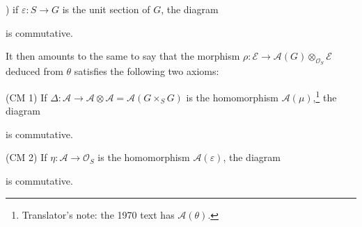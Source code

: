 \smallskip
{}\label{diag:sga3-VIB-11.6-2}%
) if \(\varepsilon:S\to G\) is the unit section of
\(G\), the diagram
\begin{center}
\end{center}
is commutative.

It then amounts to the same to say that the morphism
\(\rho:\mathcal E\to\mathcal A(G)\otimes_{\mathcal O_S}\mathcal E\)
deduced from \(\theta\) satisfies the following two axioms:

\smallskip
{}\label{cond:sga3-VIB-11.6-CM1}%
\noindent\textup{(CM 1)} If
\(\Delta:\mathcal A\to\mathcal A\otimes\mathcal A=\mathcal A(G\times_SG)\)
is the homomorphism \(\mathcal A(\mu)\),\footnote{Translator's note: the 1970
text has \(\mathcal A(\theta)\).} the diagram
\begin{center}
  \label{diag:sga3-VIB-11.6-CM1}%
\end{center}
is commutative.

\smallskip
{}\label{cond:sga3-VIB-11.6-CM2}%
\noindent\textup{(CM 2)} If \(\eta:\mathcal A\to\mathcal O_S\) is
the homomorphism \(\mathcal A(\varepsilon)\), the diagram
\begin{center}
  \label{diag:sga3-VIB-11.6-CM2}%
\end{center}
is commutative.

